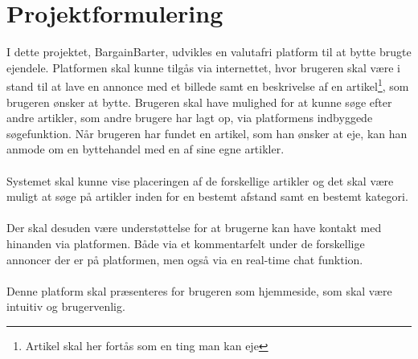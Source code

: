 \chapter{Projektformulering}

I dette projektet, BargainBarter, udvikles en valutafri platform til at bytte brugte ejendele. Platformen skal kunne tilgås via internettet, hvor brugeren skal være i stand til at lave en annonce med et billede samt en beskrivelse af en artikel\footnote{Artikel skal her fortås som en ting man kan eje}, som brugeren ønsker at bytte. Brugeren skal have mulighed for at kunne søge efter andre artikler, som andre brugere har lagt op, via platformens indbyggede søgefunktion. Når brugeren har fundet en artikel, som han ønsker at eje, kan han anmode om en byttehandel med en af sine egne artikler. \\ \\ \noindent
Systemet skal kunne vise placeringen af de forskellige artikler og det skal være muligt at søge på artikler inden for en bestemt afstand samt en bestemt kategori. \\ \\ \noindent    
Der skal desuden være understøttelse for at brugerne kan have kontakt med hinanden via platformen. Både via et kommentarfelt under de forskellige annoncer der er på platformen, men også via en real-time chat funktion. \\ \\ \noindent
\noindent Denne platform skal præsenteres for brugeren som hjemmeside, som skal være intuitiv og brugervenlig. 